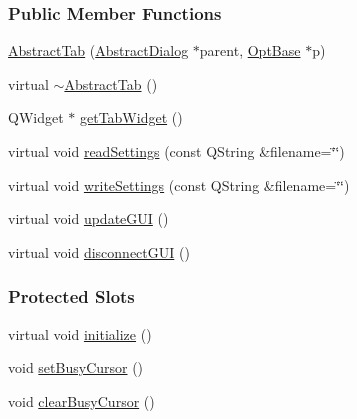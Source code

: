 \subsubsection*{Public Member Functions}
\begin{DoxyCompactItemize}
\item 
\hyperlink{classGlobalSearch_1_1AbstractTab_aead424f45ea35bc3b8d5d57dc64a9d70}{Abstract\+Tab} (\hyperlink{classGlobalSearch_1_1AbstractDialog}{Abstract\+Dialog} $\ast$parent, \hyperlink{classGlobalSearch_1_1OptBase}{Opt\+Base} $\ast$p)
\item 
virtual \hyperlink{classGlobalSearch_1_1AbstractTab_ab1c9b883cf4fc56d38045028600e20b7}{$\sim$\+Abstract\+Tab} ()
\item 
Q\+Widget $\ast$ \hyperlink{classGlobalSearch_1_1AbstractTab_a2ee691faf240a36dafde7620dc9a9293}{get\+Tab\+Widget} ()
\item 
virtual void \hyperlink{classGlobalSearch_1_1AbstractTab_adc4ad2d0853e7db17a0b147857304cba}{read\+Settings} (const Q\+String \&filename=\char`\"{}\char`\"{})
\item 
virtual void \hyperlink{classGlobalSearch_1_1AbstractTab_a5b09ac7389e664c60ee5ab11a1f8d8fd}{write\+Settings} (const Q\+String \&filename=\char`\"{}\char`\"{})
\item 
virtual void \hyperlink{classGlobalSearch_1_1AbstractTab_a35194ae3ff3b875c1f2e886a69555050}{update\+G\+U\+I} ()
\item 
virtual void \hyperlink{classGlobalSearch_1_1AbstractTab_a63ec89943d1e740fd162877c7cb3679a}{disconnect\+G\+U\+I} ()
\end{DoxyCompactItemize}
\subsubsection*{Protected Slots}
\begin{DoxyCompactItemize}
\item 
virtual void \hyperlink{classGlobalSearch_1_1AbstractTab_a70d03cb6f128710bd2af11a7915acad4}{initialize} ()
\item 
void \hyperlink{classGlobalSearch_1_1AbstractTab_a4c6f7ae72bcc7e1eaf06734b7ccb8635}{set\+Busy\+Cursor} ()
\item 
void \hyperlink{classGlobalSearch_1_1AbstractTab_a32efcb7e485b106fc728f39d3174df0e}{clear\+Busy\+Cursor} ()
\end{DoxyCompactItemize}
